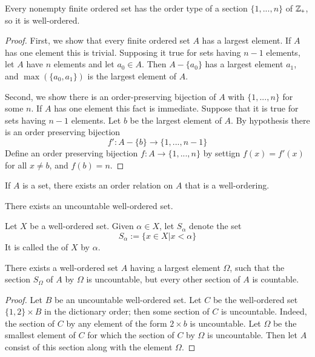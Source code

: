     \begin{theorem}
        Every nonempty finite ordered set has the order type of a section $\{1,...,n\}$ of $\mathbb Z_+$, so it is well-ordered.
    \end{theorem}
    \begin{proof}
        First, we show that every finite ordered set $A$ has a largest element. If $A$ has one element this is trivial. Supposing it true for sets having $n-1$ elements, let $A$ have $n$ elements and let $a_0 \in A$. Then $A-\{a_0\}$ has a largest element $a_1$, and $\max(\{a_0,a_1\})$ is the largest element of $A$.


        Second, we show there is an order-preserving bijection of $A$ with $\{1,...,n\}$ for some $n$. If $A$ has one element this fact is immediate. Suppose that it is true for sets having $n-1$ elements. Let $b$ be the largest element of $A$. By hypothesis there is an order preserving bijection \begin{equation*}
            f':A-\{b\}\rightarrow \{1,...,n-1\}
        \end{equation*}
        Define an order preserving bijection $f:A\rightarrow \{1,...,n\}$ by settign $f(x) = f'(x)$ for all $x \neq b$, and $f(b) = n$.
    \end{proof}

    \begin{theorem}
        If $A$ is a set, there exists an order relation on $A$ that is a well-ordering.
    \end{theorem}


    \begin{corollary}
        There exists an uncountable well-ordered set.
    \end{corollary}


    \begin{definition}
        Let $X$ be a well-ordered set. Given $\alpha \in X$, let $S_{\alpha}$ denote the set \begin{equation*}
            S_{\alpha} := \{x \in X\vert x < \alpha\}
        \end{equation*}
        It is called the  of $X$ by $\alpha$.
    \end{definition}


    \begin{lemma}
        There exists a well-ordered set $A$ having a largest element $\Omega$, such that the section $S_{\Omega}$ of $A$ by $\Omega$ is uncountable, but every other section of $A$ is countable.
    \end{lemma}
    \begin{proof}
        Let $B$ be an uncountable well-ordered set. Let $C$ be the well-ordered set $\{1,2\}\times B$ in the dictionary order; then some section of $C$ is uncountable. Indeed, the section of $C$ by any element of the form $2\times b$ is uncountable. Let $\Omega$ be the smallest element of $C$ for which the section of $C$ by $\Omega$ is uncountable. Then let $A$ consist of this section along with the element $\Omega$.
    \end{proof}

